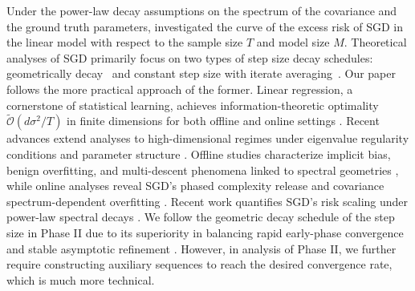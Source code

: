 Under the power-law decay assumptions on the spectrum of the covariance and the ground truth parameters, \citet{lin2024scaling,bordelon2024a,bahri2024explaining} investigated the curve of the excess risk of SGD in the linear model with respect to the sample size $T$ and model size $M$.
Theoretical analyses of SGD primarily focus on two types of step size decay schedules:  geometrically decay~\citep{ge2019step,wu2022last,zhang2024optimality} and constant step size with iterate averaging~\citep{dieuleveut2016nonparametric,dieuleveut2017harder,zou2021benign}. Our paper follows the more practical approach of the former. 
\fi
Linear regression, a cornerstone of statistical learning, achieves information-theoretic optimality $\widetilde{\mathcal{O}}\left(d\sigma^2/T\right)$ in finite dimensions for both offline and online settings \citep{bach2013non,jain2018parallelizing,ge2019step}. Recent advances extend analyses to high-dimensional regimes under eigenvalue regularity conditions and parameter structure \citep{raskutti2014early,gunasekar2017implicit,Bartlett_2020,10.1214/21-AOS2133,tsigler2023benign}. Offline studies characterize implicit bias, benign overfitting, and multi-descent phenomena linked to spectral geometries \citep{liang2020multiple,10.1214/20-AOS1990,mei2022generalization,lu2023optimal,zhang2024optimal1}, while online analyses reveal SGD’s phased complexity release and covariance spectrum-dependent overfitting \citep{dieuleveut2016nonparametric,dieuleveut2017harder,lin2017optimal,ali2020implicit,zou2021benefits,zou2021benign,wu2022last,varre2021last}. Recent work quantifies SGD’s risk scaling under power-law spectral decays \citep{lin2024scaling,bordelon2024a,bahri2024explaining}. 
We follow the geometric decay schedule of the step size \citep{ge2019step,wu2022last,zhang2024optimality}  in Phase  II due to its  superiority in balancing rapid early-phase convergence and stable asymptotic refinement \citep{ge2019step}.  However, in analysis of Phase II, we further require constructing auxiliary sequences to reach the desired convergence rate, which is much more technical.


